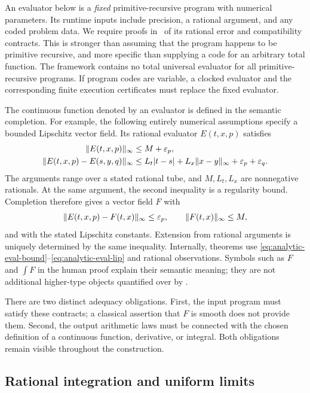 An evaluator below is a \emph{fixed} primitive-recursive program with numerical parameters.  Its runtime inputs include precision, a rational argument, and any coded problem data.  We require proofs in \ipra\ of its rational error and compatibility contracts.  This is stronger than assuming that the program happens to be primitive recursive, and more specific than supplying a code for an arbitrary total function.  The framework contains no total universal evaluator for all primitive-recursive programs.  If program codes are variable, a clocked evaluator and the corresponding finite execution certificates must replace the fixed evaluator.

The continuous function denoted by an evaluator is defined in the semantic completion.  For example, the following entirely numerical assumptions specify a bounded Lipschitz vector field.  Its rational evaluator $E(t,x,p)$ satisfies
\begin{align}
 \|E(t,x,p)\|_\infty&\le M+\varepsilon_p, \label{eq:analytic-eval-bound}\\
 \|E(t,x,p)-E(s,y,q)\|_\infty
 &\le L_t|t-s|+L_x\|x-y\|_\infty+\varepsilon_p+\varepsilon_q.\label{eq:analytic-eval-lip}
\end{align}
The arguments range over a stated rational tube, and $M,L_t,L_x$ are nonnegative rationals.  At the same argument, the second inequality is a regularity bound.  Completion therefore gives a vector field $F$ with
\[
 \|E(t,x,p)-F(t,x)\|_\infty\le\varepsilon_p,
 \qquad \|F(t,x)\|_\infty\le M,
\]
and with the stated Lipschitz constants.  Extension from rational arguments is uniquely determined by the same inequality.  Internally, theorems use \eqref{eq:analytic-eval-bound}--\eqref{eq:analytic-eval-lip} and rational observations.  Symbols such as $F$ and $\int F$ in the human proof explain their semantic meaning; they are not additional higher-type objects quantified over by \ipra.

There are two distinct adequacy obligations.  First, the input program must satisfy these contracts; a classical assertion that $F$ is smooth does not provide them.  Second, the output arithmetic laws must be connected with the chosen definition of a continuous function, derivative, or integral.  Both obligations remain visible throughout the construction.

\subsection{Rational integration and uniform limits}

